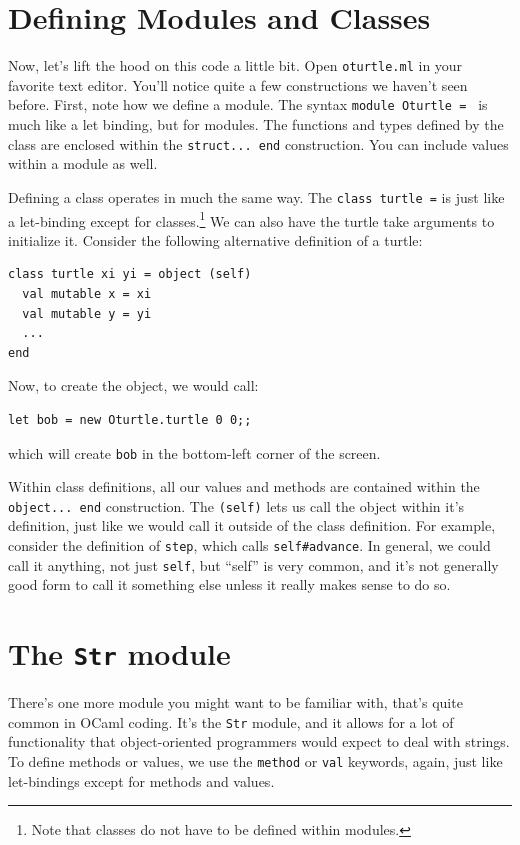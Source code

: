 \documentclass[10pt]{book}
\begin{document}
{\begin{exercises}
\end{exercises}

\section{Defining Modules and Classes}

Now, let's lift the hood on this code a little bit. Open {\tt oturtle.ml} in your favorite text editor. You'll notice quite a few constructions we haven't seen before. First, note how we define a module. The syntax {\tt module Oturtle = } is much like a let binding, but for modules. The functions and types defined by the class are enclosed within the {\tt struct... end} construction. You can include values within a module as well.

Defining a class operates in much the same way. The {\tt class turtle =} is just like a let-binding except for classes.\footnote{Note that classes do not have to be defined within modules.} We can also have the turtle take arguments to initialize it. Consider the following alternative definition of a turtle:

\beforeverb
\begin{verbatim}
class turtle xi yi = object (self)
  val mutable x = xi
  val mutable y = yi
  ...
end
\end{verbatim}
\afterverb

Now, to create the object, we would call:
\beforeverb
\begin{verbatim}
let bob = new Oturtle.turtle 0 0;;
\end{verbatim}
\afterverb
which will create {\tt bob} in the bottom-left corner of the screen.

Within class definitions, all our values and methods are contained within the {\tt object... end} construction. The {\tt (self)} lets us call the object within it's definition, just like we would call it outside of the class definition. For example, consider the definition of {\tt step}, which calls {\tt self#advance}. In general, we could call it anything, not just {\tt self}, but ``self'' is very common, and it's not generally good form to call it something else unless it really makes sense to do so.
\section{The {\tt Str} module}

There's one more module you might want to be familiar with, that's quite common in OCaml coding. It's the {\tt Str} module, and it allows for a lot of functionality that object-oriented programmers would expect to deal with strings.
To define methods or values, we use the {\tt method} or {\tt val} keywords, again, just like let-bindings except for methods and values.

}
\end{document}
